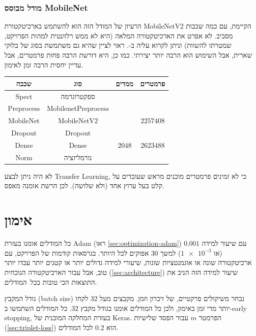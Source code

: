 \documentclass[hebrew, a4paper]{article}
\theoremstyle{plain}
\theoremstyle{definition}
\numberwithin{equation}{section}
\begin{document}
\subsubsection{מודל מבוסס MobileNet}
\label{sec:architecture-mobilenet}

הרעיון של המודל הזה הוא להשתמש בארכיטקטורת MobileNetV2 הקיימת, עם כמה
שכבות מסביב. לא אפרט את הארכיטקטורה המלאה (היא לא ממש רלוונטית למהות
הפרויקט, שמטרתו להשוות) וניתן לקרוא עליה ב-. ראוי
לציין שהיא גם משתמשת בסוג של בלוקי שארית, אבל השימוש הוא הרבה יותר
יצירתי. כמו כן, היא דורשת הרבה פחות פרמטרים, אבל עדיין יחסית הרבה זמן
לאימון.

\begin{center}
  \begin{tabular}{cccc}
    שכבה & סוג & ממדים & פרמטרים \\\hline
    Spect & ספקטרוגרמה & & \\
    Preprocess & MobilenetPreprocess & & \\
    MobileNet & MobileNetV2 & & $\num{2257408}$ \\
    Dropout & Dropout & & \\
    Dense & Dense & $\num{2048}$ & $\num{2623488}$ \\
    Norm & נורמליזציה & &
  \end{tabular}
\end{center}

לא היה ניתן לבצע Transfer Learning, כי לא זמינים פרמטרים מוכנים מראש
שעובדים על קלט בעל ערוץ אחד (ולא שלושה). לכן הרשת אומנה מאפס.

\section{אימון}
\label{sec:training}

כל המודלים אומנו בעזרת Adam (ראו \autoref{sec:optimization-adam}) עם
שיעור למידה $\num{0.001}$ (או $\num{1e-3}$) למשך $\num{30}$ אפוקים לכל
היותר. בגרסאות קודמות של הפרויקט, עם ארכיטקטורה שונה או אוגמנטציות
שונות, שיעורי למידה גדולים יותר או קטנים יותר עבדו יותר טוב, אבל עבור
הארכיטקטורה הנוכחית (\autoref{sec:architecture}) שיעור למידה הזה הניב
את התוצאות הכי טובות בכל~המודלים.

גודל המקבץ (batch size) נבחר משיקולים פרקטיים, של זיכרון וזמן. מקבצים
מעל $\num{32}$ לקחו יותר מדי זמן באימון, ולכן כל המודלים אומנו בגודל
מקבץ $\num{32}$. כל המודלים השתמשו ב-early stopping, בעזרת המחלקה
המובנית של Keras. הפרמטר $m$ עבור הפסד שלישיות
(\autoref{sec:triplet-loss}) הוא $0.2$ לכל המודלים.
\end{document}
